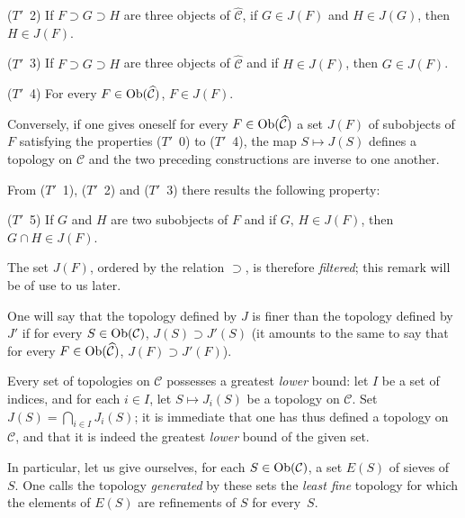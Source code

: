 \par\smallskip\noindent
(\(T'\)~2) If \(F\supset G\supset H\) are three objects of
\(\widehat{\mathcal{C}}\), if \(G\in J(F)\) and \(H\in J(G)\), then
\(H\in J(F)\).

\par\smallskip\noindent
(\(T'\)~3) If \(F\supset G\supset H\) are three objects of
\(\widehat{\mathcal{C}}\) and if \(H\in J(F)\), then \(G\in J(F)\).

\par\smallskip\noindent
(\(T'\)~4) For every \(F\in\operatorname{Ob}(\widehat{\mathcal{C}})\), \(F\in J(F)\).

Conversely, if one gives oneself for every
\(F\in\operatorname{Ob}(\widehat{\mathcal{C}})\) a set \(J(F)\) of subobjects of \(F\)
satisfying the properties (\(T'\)~0) to (\(T'\)~4), the map
\(S\mapsto J(S)\) defines a topology on \(\mathcal{C}\) and the two
preceding constructions are inverse to one another.

From (\(T'\)~1), (\(T'\)~2) and (\(T'\)~3)%
{\renewcommand{\thefootnote}{(21)}}
there results the following property:

\par\smallskip\noindent
(\(T'\)~5) If \(G\) and \(H\) are two subobjects of \(F\) and if
\(G,\,H\in J(F)\), then \(G\cap H\in J(F)\).

\noindent
The set \(J(F)\), ordered by the relation \(\supset\), is therefore
\emph{filtered}; this remark will be of use to us later.

\label{IV.4.2.2}
One will say that the topology defined by \(J\) is finer than the topology
defined by \(J'\) if for every \(S\in\operatorname{Ob}(\mathcal{C})\),
\(J(S)\supset J'(S)\) (it amounts to the same to say that for every
\(F\in\operatorname{Ob}(\widehat{\mathcal{C}})\), \(J(F)\supset J'(F)\)).

Every set of topologies on \(\mathcal{C}\) possesses a greatest
\emph{lower} bound: let \(I\) be a set of indices,
and for each \(i\in I\), let \(S\mapsto J_{i}(S)\) be a topology on
\(\mathcal{C}\). Set \(J(S)=\bigcap_{i\in I}J_{i}(S)\); it is immediate
that one has thus defined a topology on \(\mathcal{C}\), and that it is
indeed the greatest \emph{lower} bound of the given set.

In particular, let us give ourselves, for each \(S\in\operatorname{Ob}(\mathcal{C})\), a
set \(E(S)\) of sieves of~\(S\). One calls the topology \emph{generated} by
these sets the \emph{least fine} topology for which the elements of
\(E(S)\) are refinements of \(S\) for every~\(S\).

